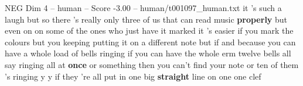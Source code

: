 \begin{textsample}{NEG Dim 4 – human – Score -3.00 – human/t001097\_human.txt}  \label{ex:f4_neg_031}
it 's such a laugh but so there 's really only three of us that can read music \textbf{properly} but even on on some of the ones who just have it marked it 's easier if you mark the colours but you keeping putting it on a different note but if and because you can have a whole load of bells ringing if you can have the whole erm twelve bells all say ringing all at \textbf{once} or something then you can't find your note or ten of them 's ringing y y if they 're all put in one big \textbf{straight} line on one one clef

\end{textsample}
